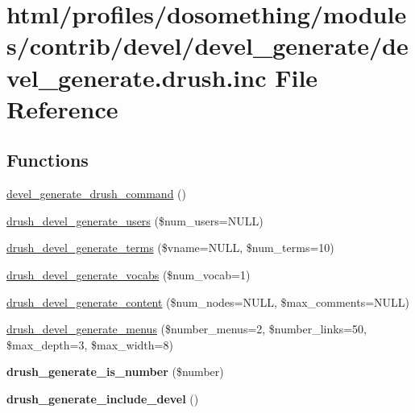 \hypertarget{devel__generate_8drush_8inc}{
\section{html/profiles/dosomething/modules/contrib/devel/devel\_\-generate/devel\_\-generate.drush.inc File Reference}
\label{devel__generate_8drush_8inc}
}
\subsection*{Functions}
\begin{DoxyCompactItemize}
\item 
\hyperlink{devel__generate_8drush_8inc_a48ece25ef0179ad642de2574d97b6f59}{devel\_\-generate\_\-drush\_\-command} ()
\item 
\hyperlink{devel__generate_8drush_8inc_aa9e2153179489bacf746e63ce8d95141}{drush\_\-devel\_\-generate\_\-users} (\$num\_\-users=NULL)
\item 
\hyperlink{devel__generate_8drush_8inc_ac6e9ac6d26aa0fe2d1ac268e28c6c036}{drush\_\-devel\_\-generate\_\-terms} (\$vname=NULL, \$num\_\-terms=10)
\item 
\hyperlink{devel__generate_8drush_8inc_a64dcfae39a21d5c14ad6446bca087778}{drush\_\-devel\_\-generate\_\-vocabs} (\$num\_\-vocab=1)
\item 
\hyperlink{devel__generate_8drush_8inc_aa37a3deadce02df0570ef63f711025b6}{drush\_\-devel\_\-generate\_\-content} (\$num\_\-nodes=NULL, \$max\_\-comments=NULL)
\item 
\hyperlink{devel__generate_8drush_8inc_a7a543f5e7641e7fa1c6d9dee12d8b93b}{drush\_\-devel\_\-generate\_\-menus} (\$number\_\-menus=2, \$number\_\-links=50, \$max\_\-depth=3, \$max\_\-width=8)
\item 
\hypertarget{devel__generate_8drush_8inc_ad7811ffe1b7ff4baa636ef0af2893674}{
{\bfseries drush\_\-generate\_\-is\_\-number} (\$number)}
\label{devel__generate_8drush_8inc_ad7811ffe1b7ff4baa636ef0af2893674}

\item 
\hypertarget{devel__generate_8drush_8inc_a7fcd36436249aa4eda96c1d834ec6e8b}{
{\bfseries drush\_\-generate\_\-include\_\-devel} ()}
\label{devel__generate_8drush_8inc_a7fcd36436249aa4eda96c1d834ec6e8b}

\end{DoxyCompactItemize}



